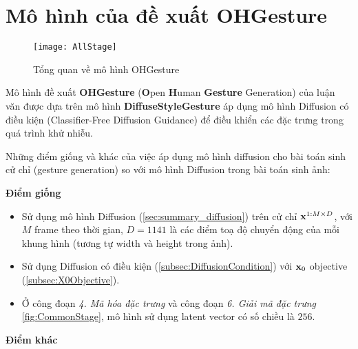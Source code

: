 \pagebreak

\section{Mô hình của đề xuất OHGesture}
\label{sec:ohgesture}

\begin{figure}[H]
	\centering
		\texttt{[image: AllStage]}
	\caption{Tổng quan về mô hình OHGesture}
	\label{fig:TrainingAndSampling}
\end{figure}

Mô hình đề xuất \textbf{OHGesture} (\textbf{O}pen \textbf{H}uman \textbf{Gesture} Generation) của luận văn được dựa trên mô hình \textbf{DiffuseStyleGesture} \cite{yang2023diffusestylegesture} áp dụng mô hình Diffusion \cite{ho2020denoising} có điều kiện \cite{ho2022classifier} (Classifier-Free Diffusion Guidance) để điều khiển các đặc trưng trong quá trình khử nhiễu.

Những điểm giống và khác của việc áp dụng mô hình diffusion cho bài toán sinh cử chỉ (gesture generation) so với mô hình Diffusion trong bài toán sinh ảnh:

\vspace{10pt}

\textbf{Điểm giống}
\begin{itemize}
	\item Sử dụng mô hình Diffusion (\autoref{sec:summary_diffusion}) trên cử chỉ $\mathbf{x}^{1:M \times D}$,  với $M$ frame theo thời gian, $D=1141$ là các điểm toạ độ chuyển động của mỗi khung hình (tương tự width và height trong ảnh).
	\item Sử dụng Diffusion có điều kiện (\autoref{subsec:DiffusionCondition}) với $\mathbf{x}_0$ objective (\autoref{subsec:X0Objective}).
	\item Ở công đoạn \textit{4. Mã hóa đặc trưng} và công đoạn \textit{6. Giải mã đặc trưng} \autoref{fig:CommonStage}, mô hình sử dụng latent vector có số chiều là $256$.
\end{itemize}

\textbf{Điểm khác}

